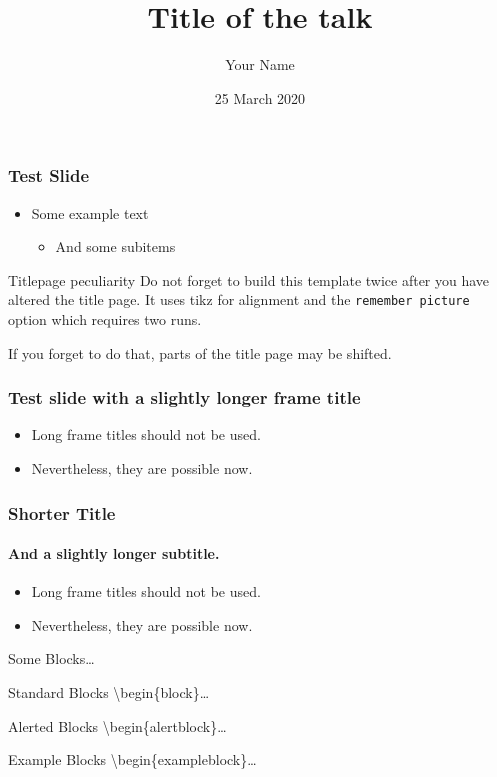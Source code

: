 \documentclass[10pt]{beamer}
\title{Title of the talk}
\date{25 March 2020}
\author{Your Name}
\institute[Univ. of G\"ottingen]{Name of the institute, Univ. of G\"ottingen}
\begin{document}
\begin{frame}
  \titlepage
\end{frame}

\begin{frame}
  \frametitle{Test Slide}

  \begin{itemize}
    \item 
      Some example text
      \begin{itemize}
        \item 
          And some subitems
      \end{itemize}
  \end{itemize}

  \begin{alertblock}{Titlepage peculiarity}
    Do not forget to build this template twice after you have altered
    the title page. It uses tikz for alignment and the 
    \texttt{remember picture} option which requires two runs.

    If you forget to do that, parts of the title page may be shifted.
  \end{alertblock}
\end{frame}

\begin{frame}
  \frametitle{Test slide with a slightly longer frame title}

  \begin{itemize}
    \item 
      Long frame titles should not be used. 
    \item
      Nevertheless, they are possible now.
  \end{itemize}
\end{frame}
\begin{frame}
  \frametitle{Shorter Title}
  \framesubtitle{And a slightly longer subtitle.}

  \begin{itemize}
    \item 
      Long frame titles should not be used. 
    \item
      Nevertheless, they are possible now.
  \end{itemize}
\end{frame}

\begin{frame}{Some Blocks\ldots}
  \begin{block}{Standard Blocks}
    \textbackslash{}begin\{block\}\ldots
  \end{block}
  \begin{alertblock}{Alerted Blocks}
    \textbackslash{}begin\{alertblock\}\ldots
  \end{alertblock}
  \begin{exampleblock}{Example Blocks}
    \textbackslash{}begin\{exampleblock\}\ldots
  \end{exampleblock}
\end{frame}
\end{document}

